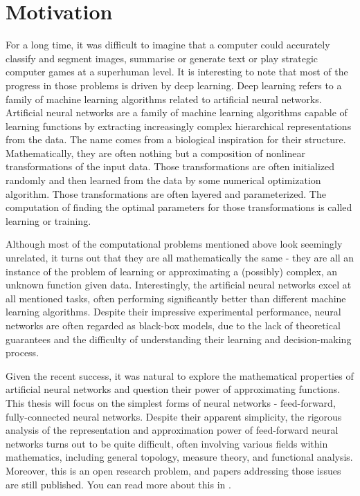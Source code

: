 \section{Motivation}

For a long time, it was difficult to imagine that a computer could accurately classify and segment images, summarise or generate text or play strategic computer games at a superhuman level. It is interesting to note that most of the progress in those problems is driven by deep learning. Deep learning refers to a family of machine learning algorithms related to artificial neural networks. Artificial neural networks are a family of machine learning algorithms capable of learning functions by extracting increasingly complex hierarchical representations from the data. The name comes from a biological inspiration for their structure.
Mathematically, they are often nothing but a composition of nonlinear transformations of the input data. Those transformations are often initialized randomly and then learned from the data by some numerical optimization algorithm. Those transformations are often layered and parameterized. The computation of finding the optimal parameters for those transformations is called learning or training.

Although most of the computational problems mentioned above look seemingly unrelated, it turns out that they are all mathematically the same - they are all an instance of the problem of learning or approximating a (possibly) complex, an unknown function given data. Interestingly, the artificial neural networks excel at all mentioned tasks, often performing significantly better than different machine learning algorithms. Despite their impressive experimental performance, neural networks are often regarded as black-box models, due to the lack of theoretical guarantees and the difficulty of understanding their learning and decision-making process.

Given the recent success, it was natural to explore the mathematical properties of artificial neural networks and question their power of approximating functions. This thesis will focus on the simplest forms of neural networks - feed-forward, fully-connected neural networks. Despite their apparent simplicity, the rigorous analysis of the representation and approximation power of feed-forward neural networks turns out to be quite difficult, often involving various fields within mathematics, including general topology, measure theory, and functional analysis. Moreover, this is an open research problem, and papers addressing those issues are still published. You can read more about this in .

